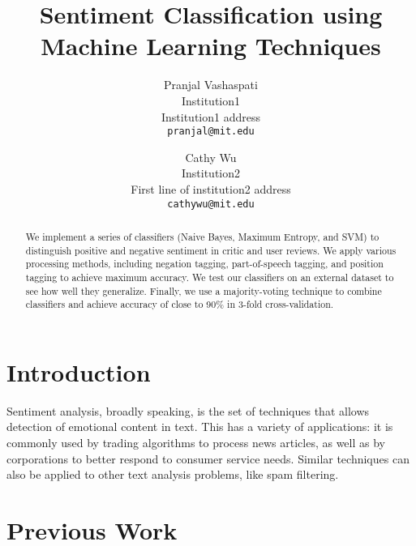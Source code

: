 \documentclass[10pt,twocolumn,letterpaper]{article}
\begin{document}
\title{Sentiment Classification using Machine Learning Techniques}

\author{Pranjal Vashaspati\\
Institution1\\
Institution1 address\\
{\tt\small pranjal@mit.edu}
\and
Cathy Wu\\
Institution2\\
First line of institution2 address\\
{\tt\small cathywu@mit.edu}
}

\maketitle
\thispagestyle{empty}

\begin{abstract}
We implement a series of classifiers (Naive Bayes, Maximum Entropy, and SVM) to distinguish positive and negative sentiment in critic and user reviews. We apply various processing methods, including negation tagging, part-of-speech tagging, and position tagging to achieve maximum accuracy. We test our classifiers on an external dataset to see how well they generalize. Finally, we use a majority-voting technique to combine classifiers and achieve accuracy of close to 90\% in 3-fold cross-validation.
\end{abstract}

\section{Introduction}

Sentiment analysis, broadly speaking, is the set of techniques that allows detection of emotional content in text. This has a variety of applications: it is commonly used by trading algorithms to process news articles, as well as by corporations to better respond to consumer service needs. Similar techniques can also be applied to other text analysis problems, like spam filtering.

\section{Previous Work}
\end{document}
